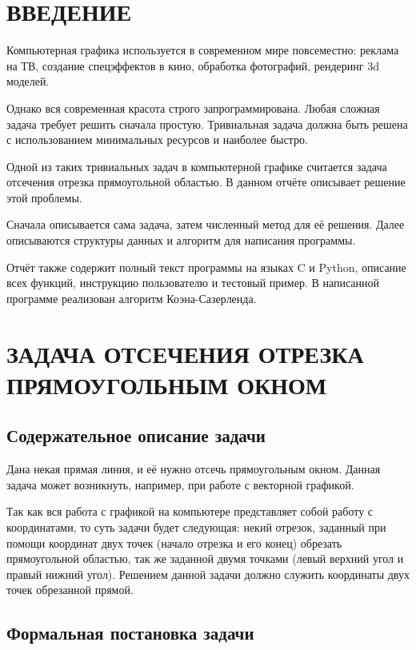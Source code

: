 

\setcounter{page}{2}
\normalfont
\tableofcontents
\clearpage
\section*{ВВЕДЕНИЕ}
Компьютерная графика используется в современном мире повсеместно: реклама на ТВ, создание спецэффектов в кино, обработка фотографий, рендеринг 3d моделей.

Однако вся современная красота строго запрограммирована. Любая сложная задача требует решить сначала простую. Тривиальная задача должна быть решена с использованием минимальных ресурсов и наиболее быстро.

Одной из таких тривиальных задач в компьютерной графике считается задача отсечения отрезка прямоугольной областью. В данном отчёте описывает решение этой проблемы.

Сначала описывается сама задача, затем численный метод для её решения. Далее описываются структуры данных и алгоритм для написания программы.

Отчёт также содержит полный текст программы на языках C и Python, описание всех функций, инструкцию пользователю и тестовый пример. В написанной программе реализован алгоритм Коэна-Сазерленда.
\clearpage
\section{ЗАДАЧА ОТСЕЧЕНИЯ ОТРЕЗКА ПРЯМОУГОЛЬНЫМ ОКНОМ}
\subsection{Содержательное описание задачи}
Дана некая прямая линия, и её нужно отсечь прямоугольным окном. Данная задача может возникнуть, например, при работе с векторной графикой.

Так как вся работа с графикой на компьютере представляет собой работу с координатами, то суть задачи будет следующая: некий отрезок, заданный при помощи координат двух точек (начало отрезка и его конец) обрезать прямоугольной областью, так же заданной двумя точками (левый верхний угол и правый нижний угол). Решением данной задачи должно служить координаты двух точек обрезанной прямой.
\subsection{Формальная постановка задачи}

